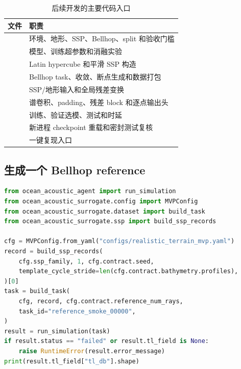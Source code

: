 \documentclass[UTF8,11pt]{ctexart}
\begin{document}
\begin{table}[H]
\centering
\caption{后续开发的主要代码入口}
\begin{tabularx}{\textwidth}{L{5.2cm}Y}
\toprule
文件 & 职责 \\
\midrule
{} & 环境、地形、SSP、Bellhop、split 和验收门槛 \\
 & 模型、训练超参数和消融实验 \\
 & Latin hypercube 和平滑 SSP 构造 \\
 & Bellhop task、收敛、断点生成和数据打包 \\
 & SSP/地形输入和全局残差变换 \\
 & 谱卷积、padding、残差 block 和逐点输出头 \\
 & 训练、验证选模、测试和时延 \\
 & 新进程 checkpoint 重载和密封测试复核 \\
 & 一键复现入口 \\
\bottomrule
\end{tabularx}
\end{table}

\subsection{生成一个 Bellhop reference}

\begin{lstlisting}[style=repro,language=Python]
from ocean_acoustic_agent import run_simulation
from ocean_acoustic_surrogate.config import MVPConfig
from ocean_acoustic_surrogate.dataset import build_task
from ocean_acoustic_surrogate.ssp import build_ssp_records

cfg = MVPConfig.from_yaml("configs/realistic_terrain_mvp.yaml")
record = build_ssp_records(
    cfg.ssp_family, 1, cfg.contract.seed,
    template_cycle_stride=len(cfg.contract.bathymetry.profiles),
)[0]
task = build_task(
    cfg, record, cfg.contract.reference_num_rays,
    task_id="reference_smoke_00000",
)
result = run_simulation(task)
if result.status == "failed" or result.tl_field is None:
    raise RuntimeError(result.error_message)
print(result.tl_field["tl_db"].shape)
\end{lstlisting}
\end{document}
